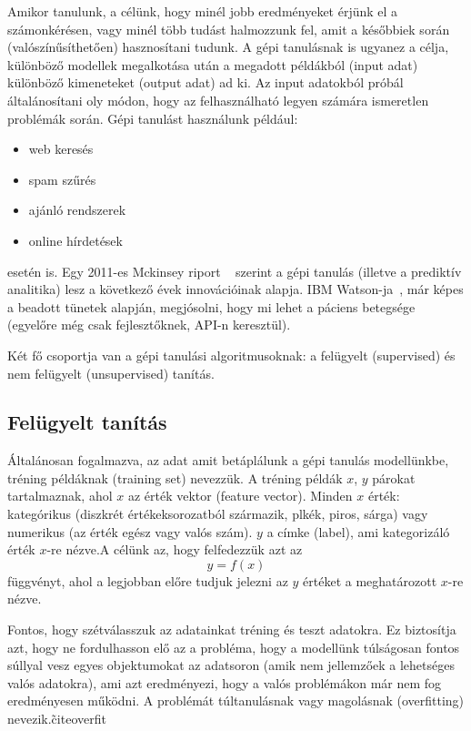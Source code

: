\documentclass[a4paper,12pt]{article}
\begin{document}
Amikor tanulunk, a célünk, hogy minél jobb eredményeket érjünk el a számonkérésen, vagy minél több tudást halmozzunk fel, amit a későbbiek során (valószínűsíthetően) hasznosítani tudunk. A gépi tanulásnak is ugyanez a célja, különböző modellek megalkotása után a megadott példákból (input adat) különböző kimeneteket (output adat) ad ki. Az input adatokból próbál általánosítani oly módon, hogy az felhasználható legyen számára ismeretlen problémák során. Gépi tanulást használunk például: 
\begin{itemize}
\item web keresés
\item spam szűrés
\item ajánló rendszerek
\item online hírdetések
\end{itemize}
esetén is. 
Egy 2011-es Mckinsey riport ~\cite{mckinsey} szerint a gépi tanulás (illetve a prediktív analitika) lesz a következő évek innovációinak alapja. IBM Watson-ja~\cite{watson}, már képes a beadott tünetek alapján, megjósolni, hogy mi lehet a páciens betegsége (egyelőre még csak fejlesztőknek, API-n keresztül). \linebreak

Két fő csoportja van a gépi tanulási algoritmusoknak: a felügyelt (supervised) és nem felügyelt (unsupervised) tanítás.

\subsection{Felügyelt tanítás}

Általánosan fogalmazva, az adat amit betáplálunk a gépi tanulás modellünkbe, tréning példáknak (training set) nevezzük. A tréning példák $x$, $y$ párokat tartalmaznak, ahol $x$ az érték vektor (feature vector). Minden $x$ érték: kategórikus (diszkrét értékeksorozatból származik, pl{kék, piros, sárga}) vagy numerikus (az érték egész vagy valós szám). $y$ a címke (label), ami kategorizáló érték $x$-re nézve.A célünk az, hogy felfedezzük azt az 
\begin{equation*} y=f(x)
\end{equation*}
függvényt, ahol a legjobban előre tudjuk jelezni az $y$ értéket a meghatározott $x$-re nézve.

Fontos, hogy szétválasszuk az adatainkat tréning és teszt adatokra. Ez biztosítja azt, hogy ne fordulhasson elő az a probléma, hogy a modellünk túlságosan fontos súllyal vesz egyes objektumokat az adatsoron (amik nem jellemzőek a lehetséges valós adatokra), ami azt eredményezi, hogy a valós problémákon már nem fog eredményesen működni. A problémát túltanulásnak vagy magolásnak (overfitting) nevezik.\~cite{overfit}
\end{document}
